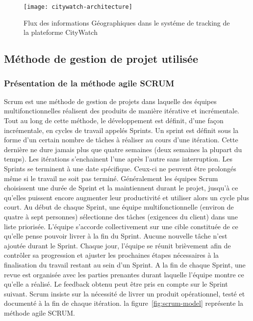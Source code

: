 \begin{figure}[htbp]
  \centering
  \texttt{[image: citywatch-architecture]}
  \caption[Flux des information Géographiques en CityWatch]
  {Flux des informations Géographiques dans le systéme de tracking de la plateforme CityWatch}
  \label{fig:citywatch-architecture}
\end{figure}

\subsection{Méthode de gestion de projet utilisée}

\subsubsection{Présentation de la méthode agile SCRUM}

Scrum est une méthode de gestion de projets dans laquelle des équipes
multifonctionnelles réalisent des produits de manière itérative et incrémentale. Tout au
long de cette méthode, le développement est définit, d’une façon incrémentale, en cycles
de travail appelés Sprints. Un sprint est définit sous la forme d’un certain nombre de
tâches à réaliser au cours d’une itération. Cette dernière ne dure jamais plus que quatre
semaines (deux semaines la plupart du temps). Les itérations s’enchainent l’une après
l’autre sans interruption. Les Sprints se terminent à une date spécifique. Ceux-ci ne
peuvent être prolongés même si le travail ne soit pas terminé. Généralement les équipes
Scrum choisissent une durée de Sprint et la maintiennent durant le projet, jusqu’à ce
qu’elles puissent encore augmenter leur productivité et utiliser alors un cycle plus court.
Au début de chaque Sprint, une équipe multifonctionnelle (environ de quatre à sept
personnes) sélectionne des tâches (exigences du client) dans une liste priorisée.
L’équipe s’accorde collectivement sur une cible constituée de ce qu’elle pense pouvoir
livrer à la fin du Sprint. Aucune nouvelle tâche n’est ajoutée durant le Sprint. Chaque
jour, l’équipe se réunit brièvement afin de contrôler sa progression et ajuster les
prochaines étapes nécessaires à la finalisation du travail restant au sein d’un Sprint. A la
fin de chaque Sprint, une revue est organisée avec les parties prenantes durant laquelle
l’équipe montre ce qu’elle a réalisé. Le feedback obtenu peut être pris en compte sur le
Sprint suivant. Scrum insiste sur la nécessité de livrer un produit opérationnel,
testé et documenté à la fin de chaque itération.
la figure~\ref{fig:scrum-model} représente la méthode agile SCRUM. 

